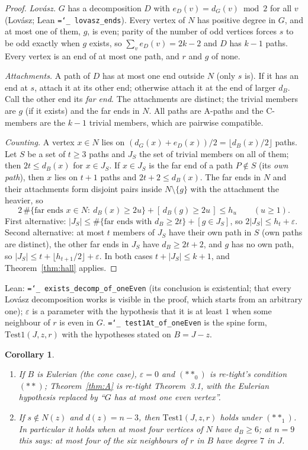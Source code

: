 \documentclass[11pt]{amsart}
\newtheorem{corollary}[theorem]{Corollary}
\theoremstyle{definition}
\newcommand{\lean}[1]{\texttt{\hyphenchar\font=`\_ #1}}
\begin{document}
\begin{proof}
\emph{Lov\'asz.} $G$ has a decomposition $D$ with $e_D(v)=d_G(v)\bmod 2$ for all $v$ (Lov\'asz; Lean
\lean{lovasz\_ends}). Every vertex of $N$ has positive degree in $G$, and at most one of them, $g$,
is even; parity of the number of odd vertices forces $s$ to be odd exactly when $g$ exists, so
$\sum_v e_D(v)=2k-2$ and $D$ has $k-1$ paths. Every vertex is an end of at most one path, and $r$ and
$g$ of none.

\emph{Attachments.} A path of $D$ has at most one end outside $N$ (only $s$ is). If it has an end at
$s$, attach it at its other end; otherwise attach it at the end of larger $d_B$. Call the other end
its \emph{far end}. The attachments are distinct; the trivial members are $g$ (if it exists) and the
far ends in $N$. All paths are A-paths and the C-members are the $k-1$ trivial members, which are
pairwise compatible.

\emph{Counting.} A vertex $x\in N$ lies on $(d_G(x)+e_D(x))/2=\lfloor d_B(x)/2\rfloor$ paths. Let $S$ be
a set of $t\ge3$ paths and $J_S$ the set of trivial members on all of them; then $2t\le d_B(x)$ for
$x\in J_S$. If $x\in J_S$ is the far end of a path $P\notin S$ (its \emph{own path}), then $x$ lies
on $t+1$ paths and $2t+2\le d_B(x)$. The far ends in $N$ and their attachments form disjoint pairs
inside $N\setminus\{g\}$ with the attachment the heavier, so
\[
2\,\#\{\text{far ends }x\in N:\ d_B(x)\ge2u\}+[\,d_B(g)\ge 2u\,]\le h_u\qquad(u\ge1).
\]
First alternative: $|J_S|\le\#\{\text{far ends with }d_B\ge2t\}+[g\in J_S]$, so
$2|J_S|\le h_t+\varepsilon$. Second alternative: at most $t$ members of $J_S$ have their own path in
$S$ (own paths are distinct), the other far ends in $J_S$ have $d_B\ge2t+2$, and $g$ has no own path,
so $|J_S|\le t+\lfloor h_{t+1}/2\rfloor+\varepsilon$. In both cases $t+|J_S|\le k+1$, and
Theorem~\ref{thm:hall} applies.
\end{proof}

Lean: \lean{exists\_decomp\_of\_oneEven} (its conclusion is existential; that every Lov\'asz decomposition
works is visible in the proof, which starts from an arbitrary one); $\varepsilon$ is a parameter with the hypothesis that it is at
least $1$ when some neighbour of $r$ is even in $G$. \lean{test1At\_of\_oneEven} is the spine form,
$\mathrm{Test1}(J,z,r)$ with the hypotheses stated on $B=J-z$.

\begin{corollary}\label{cor:A}
\begin{enumerate}[label=(\alph*)]
\item If $B$ is Eulerian (the cone case), $\varepsilon=0$ and $(\ast\ast_0)$ is re-tight's condition
$(\ast\ast)$; Theorem~\ref{thm:A} is re-tight Theorem~3.1, with the Eulerian hypothesis replaced by
``$G$ has at most one even vertex''.
\item If $s\notin N(z)$ and $d(z)=n-3$, then $\mathrm{Test1}(J,z,r)$ holds under $(\ast\ast_1)$. In
particular it holds when at most four vertices of $N$ have $d_B\ge6$; at $n=9$ this says: at most four
of the six neighbours of $r$ in $B$ have degree $7$ in $J$.
\end{enumerate}
\end{corollary}
\end{document}
